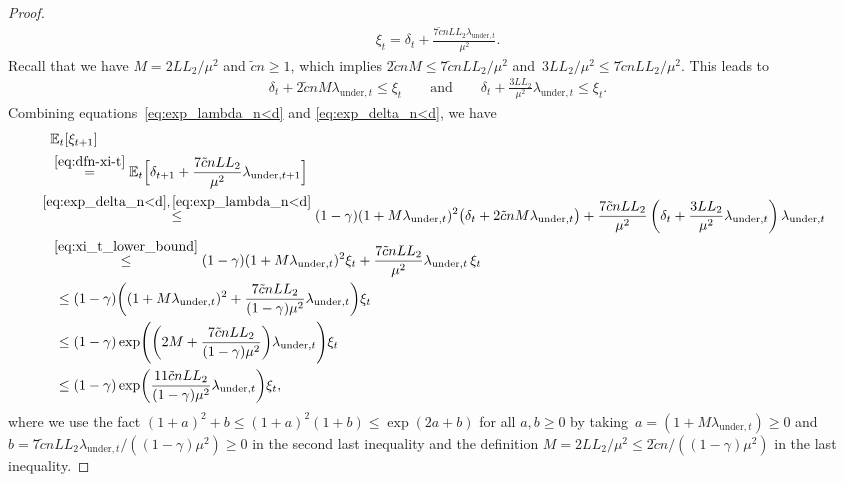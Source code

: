 \documentclass[11pt]{article}
\theoremstyle{plain}
\theoremstyle{definition}
\theoremstyle{remark}
\theoremstyle{plain}
\def\BE{{\mathbb{E}}}
\begin{document}
\begin{proof}
\begin{align}
\xi_t=\delta_t + \frac{7\tilde c nLL_2\lambda_{\mathrm{under},t}}{\mu^2}.    
\end{align}
Recall that we have $M=2LL_2/\mu^2$ and $\tilde c n\geq1$, which implies
$2\tilde c nM\leq7\tilde c nLL_2/\mu^2$ and~$3LL_2/\mu^2\leq7\tilde c nLL_2/\mu^2$.
This leads to
\begin{align}
    \label{eq:xi_t_lower_bound}
\delta_t+2\tilde{c}nM\lambda_{\mathrm{under},t}\leq\xi_t\qquad\text{and}\qquad\delta_t+ \frac{3LL_2}{\mu^2}\lambda_{\mathrm{under},t}\leq\xi_t.
\end{align}
Combining equations~\eqref{eq:exp_lambda_n<d} and \eqref{eq:exp_delta_n<d}, we have
\begingroup
\small
\begin{align}
\label{eq:xi_t_one_iter_n<d}
\begin{split}    
&\mathbb E_t[\xi_{t+1}]
\\&\overset{\eqref{eq:dfn-xi-t}}{=}
\BE_t\Bigl[\delta_{t+1}
+\frac{7\tilde c nLL_2}{\mu^2}\lambda_{\mathrm{under},t+1}\Bigr]\\
&\!\!\!\!\!\overset{\eqref{eq:exp_delta_n<d},\,\eqref{eq:exp_lambda_n<d}}{\leq}
(1-\gamma)(1+M\lambda_{\mathrm{under},t})^2
\bigl(\delta_t+2\tilde{c}nM\lambda_{\mathrm{under},t}\bigr)+\frac{7\tilde c nLL_2}{\mu^2}
\left(\delta_t+\frac{3LL_2}{\mu^2}\lambda_{\mathrm{under},t}\right)
\lambda_{\mathrm{under},t}\\
&\overset{\eqref{eq:xi_t_lower_bound}}{\leq}
(1-\gamma)(1+M\lambda_{\mathrm{under},t})^2\xi_t
 +\frac{7\tilde c nLL_2}{\mu^2}\lambda_{\mathrm{under},t}\,\xi_t \\
&~\leq(1-\gamma)\biggl((1+M\lambda_{\mathrm{under},t})^2
+\frac{7\tilde c nLL_2}{(1-\gamma)\mu^2}
\lambda_{\mathrm{under},t}\biggr)\xi_t\\
&~\leq(1-\gamma)
\exp\Biggl(\biggl(2M+\frac{7\tilde c nLL_2}
{(1-\gamma)\mu^2}\biggr)\lambda_{\mathrm{under},t}\Biggr)\xi_t \\
&~\leq(1-\gamma)
 \exp\biggl(\frac{11\tilde c nLL_2}{(1-\gamma)\mu^2}\lambda_{\mathrm{under},t}\biggr)\xi_t,
\end{split}
\end{align}
\endgroup
where we use the fact $(1+a)^2+b\leq (1+a)^2(1+b)\leq \exp(2a+b)$ for all $a,b\geq 0$ by taking~$a = (1+M\lambda_{\mathrm{under},t})\geq 0$ and $b = 7\tilde{c}nLL_2\lambda_{\mathrm{under},t}/((1-\gamma)\mu^2)\geq 0$ in the second last inequality and the definition $M=2LL_2/\mu^2\leq 2\tilde{c}n/((1-\gamma)\mu^2)$ in the last inequality.

\end{proof}
\end{document}
